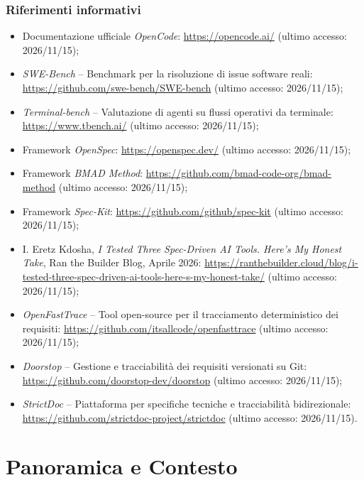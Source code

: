 \documentclass[a4paper, 11pt]{article}
\begin{document}
\subsubsection{Riferimenti informativi}
\begin{itemize}[noitemsep]
    \item Documentazione ufficiale \textit{OpenCode}: \url{https://opencode.ai/} (ultimo accesso: 2026/11/15);
    \item \textit{SWE-Bench} -- Benchmark per la risoluzione di issue software reali: \url{https://github.com/swe-bench/SWE-bench} (ultimo accesso: 2026/11/15);
    \item \textit{Terminal-bench} -- Valutazione di agenti su flussi operativi da terminale: \url{https://www.tbench.ai/} (ultimo accesso: 2026/11/15);
    \item Framework \textit{OpenSpec}: \url{https://openspec.dev/} (ultimo accesso: 2026/11/15);
    \item Framework \textit{BMAD Method}: \url{https://github.com/bmad-code-org/bmad-method} (ultimo accesso: 2026/11/15);
    \item Framework \textit{Spec-Kit}: \url{https://github.com/github/spec-kit} (ultimo accesso: 2026/11/15);
    \item I. Eretz Kdosha, \textit{I Tested Three Spec-Driven AI Tools. Here's My Honest Take}, Ran the Builder Blog, Aprile 2026: \url{https://ranthebuilder.cloud/blog/i-tested-three-spec-driven-ai-tools-here-s-my-honest-take/} (ultimo accesso: 2026/11/15);
    \item \textit{OpenFastTrace} -- Tool open-source per il tracciamento deterministico dei requisiti: \url{https://github.com/itsallcode/openfasttrace} (ultimo accesso: 2026/11/15);
    \item \textit{Doorstop} -- Gestione e tracciabilità dei requisiti versionati su Git: \url{https://github.com/doorstop-dev/doorstop} (ultimo accesso: 2026/11/15);
    \item \textit{StrictDoc} -- Piattaforma per specifiche tecniche e tracciabilità bidirezionale: \url{https://github.com/strictdoc-project/strictdoc} (ultimo accesso: 2026/11/15).
\end{itemize}


\section{Panoramica e Contesto}
\end{document}
